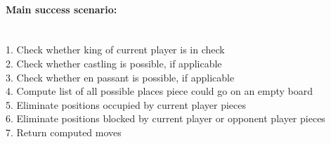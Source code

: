 \documentclass{article}
\begin{document}
\paragraph{Main success scenario:}\mbox{}\\
1. Check whether king of current player is in check\\
2. Check whether castling is possible, if applicable\\
3. Check whether en passant is possible, if applicable\\
4. Compute list of all possible places piece could go on an empty board\\
5. Eliminate positions occupied by current player pieces\\
6. Eliminate positions blocked by current player or opponent player pieces\\
7. Return computed moves
\end{document}
